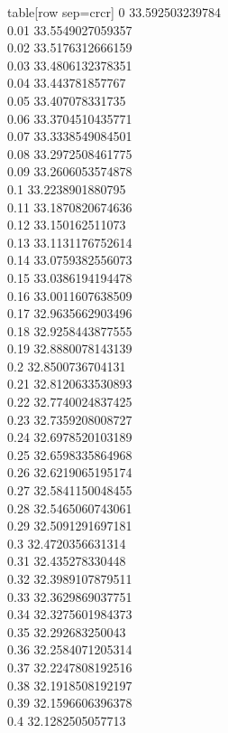   table[row sep=crcr]{%
0	33.592503239784\\
0.01	33.5549027059357\\
0.02	33.5176312666159\\
0.03	33.4806132378351\\
0.04	33.443781857767\\
0.05	33.407078331735\\
0.06	33.3704510435771\\
0.07	33.3338549084501\\
0.08	33.2972508461775\\
0.09	33.2606053574878\\
0.1	33.2238901880795\\
0.11	33.1870820674636\\
0.12	33.150162511073\\
0.13	33.1131176752614\\
0.14	33.0759382556073\\
0.15	33.0386194194478\\
0.16	33.0011607638509\\
0.17	32.9635662903496\\
0.18	32.9258443877555\\
0.19	32.8880078143139\\
0.2	32.8500736704131\\
0.21	32.8120633530893\\
0.22	32.7740024837425\\
0.23	32.7359208008727\\
0.24	32.6978520103189\\
0.25	32.6598335864968\\
0.26	32.6219065195174\\
0.27	32.5841150048455\\
0.28	32.5465060743061\\
0.29	32.5091291697181\\
0.3	32.4720356631314\\
0.31	32.435278330448\\
0.32	32.3989107879511\\
0.33	32.3629869037751\\
0.34	32.3275601984373\\
0.35	32.292683250043\\
0.36	32.2584071205314\\
0.37	32.2247808192516\\
0.38	32.1918508192197\\
0.39	32.1596606396378\\
0.4	32.1282505057713\\
}
